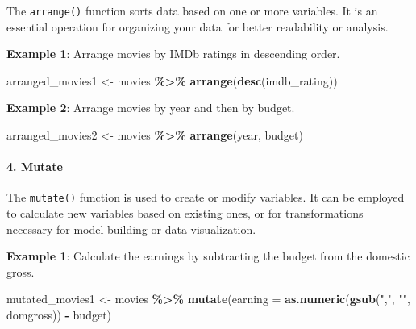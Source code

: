 \documentclass[
]{book}
\newenvironment{Shaded}{\begin{snugshade}}{\end{snugshade}}
\newcommand{\AttributeTok}[1]{\textcolor[rgb]{0.13,0.29,0.53}{#1}}
\newcommand{\FunctionTok}[1]{\textcolor[rgb]{0.13,0.29,0.53}{\textbf{#1}}}
\newcommand{\NormalTok}[1]{#1}
\newcommand{\OtherTok}[1]{\textcolor[rgb]{0.56,0.35,0.01}{#1}}
\newcommand{\SpecialCharTok}[1]{\textcolor[rgb]{0.81,0.36,0.00}{\textbf{#1}}}
\newcommand{\StringTok}[1]{\textcolor[rgb]{0.31,0.60,0.02}{#1}}
\begin{document}
The \texttt{arrange()} function sorts data based on one or more variables. It is an essential operation for organizing your data for better readability or analysis.

\textbf{Example 1}: Arrange movies by IMDb ratings in descending order.

\begin{Shaded}
\begin{Highlighting}[]
\NormalTok{arranged\_movies1 }\OtherTok{\textless{}{-}}\NormalTok{ movies }\SpecialCharTok{\%\textgreater{}\%}
  \FunctionTok{arrange}\NormalTok{(}\FunctionTok{desc}\NormalTok{(imdb\_rating))}
\end{Highlighting}
\end{Shaded}

\textbf{Example 2}: Arrange movies by year and then by budget.

\begin{Shaded}
\begin{Highlighting}[]
\NormalTok{arranged\_movies2 }\OtherTok{\textless{}{-}}\NormalTok{ movies }\SpecialCharTok{\%\textgreater{}\%}
  \FunctionTok{arrange}\NormalTok{(year, budget)}
\end{Highlighting}
\end{Shaded}

\paragraph*{4. Mutate}\label{mutate}

The \texttt{mutate()} function is used to create or modify variables. It can be employed to calculate new variables based on existing ones, or for transformations necessary for model building or data visualization.

\textbf{Example 1}: Calculate the earnings by subtracting the budget from the domestic gross.

\begin{Shaded}
\begin{Highlighting}[]
\NormalTok{mutated\_movies1 }\OtherTok{\textless{}{-}}\NormalTok{ movies }\SpecialCharTok{\%\textgreater{}\%}
  \FunctionTok{mutate}\NormalTok{(}\AttributeTok{earning =} \FunctionTok{as.numeric}\NormalTok{(}\FunctionTok{gsub}\NormalTok{(}\StringTok{","}\NormalTok{, }\StringTok{""}\NormalTok{, domgross)) }\SpecialCharTok{{-}}\NormalTok{ budget)}
\end{Highlighting}
\end{Shaded}
\end{document}
